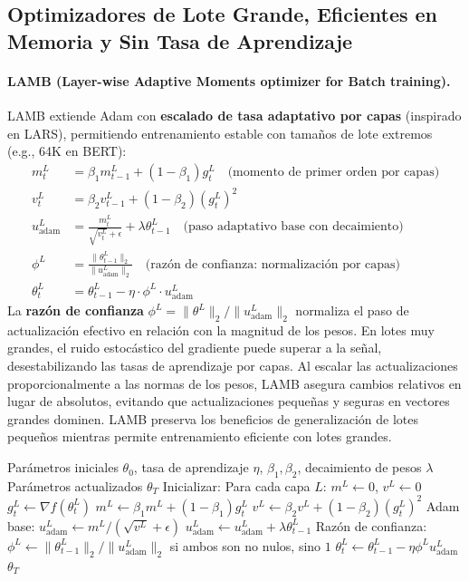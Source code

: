 \subsection{Optimizadores de Lote Grande, Eficientes en Memoria y Sin Tasa de Aprendizaje}
\paragraph{LAMB (Layer-wise Adaptive Moments optimizer for Batch training).}
LAMB extiende Adam con \textbf{escalado de tasa adaptativo por capas} (inspirado en LARS), permitiendo entrenamiento estable con tamaños de lote extremos (e.g., 64K en BERT):
\begin{align}
m_t^L &= \beta_1 m_{t-1}^L + (1-\beta_1)g_t^L \quad\text{(momento de primer orden por capas)} \\
v_t^L &= \beta_2 v_{t-1}^L + (1-\beta_2)(g_t^L)^2 \\
u_{\text{adam}}^L &= \frac{m_t^L}{\sqrt{v_t^L}+\epsilon} + \lambda\theta_{t-1}^L \quad\text{(paso adaptativo base con decaimiento)} \\
\phi^L &= \frac{\|\theta_{t-1}^L\|_2}{\|u_{\text{adam}}^L\|_2} \quad\text{(razón de confianza: normalización por capas)} \\
\theta_t^L &= \theta_{t-1}^L - \eta \cdot \phi^L \cdot u_{\text{adam}}^L
\end{align}
La \textbf{razón de confianza} $\phi^L = \|\theta^L\|_2 / \|u_{\text{adam}}^L\|_2$ normaliza el paso de actualización efectivo en relación con la magnitud de los pesos. En lotes muy grandes, el ruido estocástico del gradiente puede superar a la señal, desestabilizando las tasas de aprendizaje por capas. Al escalar las actualizaciones proporcionalmente a las normas de los pesos, LAMB asegura cambios relativos en lugar de absolutos, evitando que actualizaciones pequeñas y seguras en vectores grandes dominen. LAMB preserva los beneficios de generalización de lotes pequeños mientras permite entrenamiento eficiente con lotes grandes.

\begin{algorithm}[H]
\caption{LAMB (Layer-wise Adaptive Moments optimizer for Batch training)}
\label{alg:lamb}
\begin{algorithmic}[1]
\Require Parámetros iniciales $\theta_0$, tasa de aprendizaje $\eta$, $\beta_1, \beta_2$, decaimiento de pesos $\lambda$
\Ensure Parámetros actualizados $\theta_T$
\State Inicializar: Para cada capa $L$: $m^L \gets 0$, $v^L \gets 0$
        \State $g_t^L \gets \nabla f(\theta_t^L)$
        \State $m^L \gets \beta_1 m^L + (1-\beta_1) g_t^L$
        \State $v^L \gets \beta_2 v^L + (1-\beta_2) (g_t^L)^2$
        \State Adam base: $u_{\text{adam}}^L \gets m^L / (\sqrt{v^L} + \epsilon)$
            \State $u_{\text{adam}}^L \gets u_{\text{adam}}^L + \lambda \theta_{t-1}^L$
        \EndIf
        \State Razón de confianza: $\phi^L \gets \|\theta_{t-1}^L\|_2 / \|u_{\text{adam}}^L\|_2$ si ambos son no nulos, sino $1$
        \State $\theta_t^L \gets \theta_{t-1}^L - \eta \phi^L u_{\text{adam}}^L$
    \EndFor
\EndFor
\Return $\theta_T$
\end{algorithmic}
\end{algorithm}

